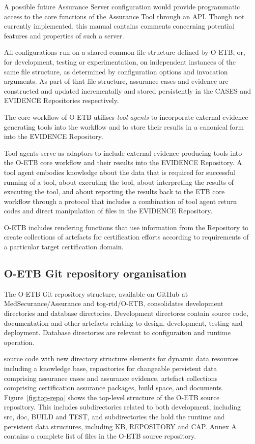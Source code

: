 \documentclass[12pt,twoside,a4paper]{article}
\begin{document}
A possible future Assurance Server configuration would provide programmatic access to the core functions of the Assurance Tool through an API. Though not currently implemented, this manual contains comments concerning potential features and properties of such a server.

All configurations run on a shared common file structure defined by O-ETB, or, for development, testing or experimentation, on independent instances of the same file structure, as determined by configuration options and invocation arguments. As part of that file structure, assurance cases and evidence are constructed and updated incrementally and stored persistently in the CASES and EVIDENCE Repositories respectively.

The core workflow of O-ETB utilises \emph{tool agents} to incorporate external evidence-generating tools into the workflow and to store their results in a canonical form into the EVIDENCE Repository.

Tool agents serve as adaptors to include external evidence-producing tools into the O-ETB core workflow and their results into the EVIDENCE Repository. A tool agent embodies knowledge about the data that is required for successful running of a tool, about executing the tool, about interpreting the results of executing the tool, and about reporting the results back to the ETB core workflow through a protocol that includes a combination of tool agent return codes and direct manipulation of files in the EVIDENCE Repository.

O-ETB includes rendering functions that use information from the Repository to create collections of artefacts for certification efforts according to requirements of a particular target certification domain.

\hypertarget{o-etb-git-repository-organisation}{%
\subsection{O-ETB Git repository organisation}\label{o-etb-git-repository-organisation}}

The O-ETB Git repository structure, available on GitHub at MedSecurance/Assurance and tog-rtd/O-ETB, consolidates development directories and database directories.
Development directores contain source code, documentation and other artefacts relating to design, development, testing and deployment.
Database directories are relevant to configuraiton and runtime operation.

source code with new directory structure elements for dynamic data resources including a knowledge base, repositories for changeable persistent data comprising assurance cases and assurance evidence, artefact collections comprising certification assurance packages, build space, and documents. Figure~\ref{fig:top-repo} shows the top-level structure of the O-ETB source repository. This includes subdirectories related to both development, including src, doc, BUILD and TEST, and subdirectories the hold the runtime and persistent data structures, including KB, REPOSITORY and CAP. Annex A contains a complete list of files in the O-ETB source repository.
\end{document}
